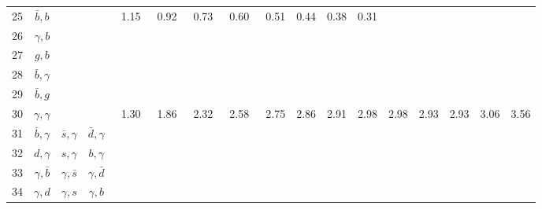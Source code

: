 \begin{tabular}{rcccccccccccccccc}
  25 & $\bar b,b$       &                  &                 &\ 1.15 &\ 0.92 &\ 0.73 &\ 0.60 &\ 0.51 & 0.44 & 0.38 & 0.31 &      &      &      &      &      \\
  26 & $\gamma, b$      &                  &                 &       &       &       &       &       &      &      &      &      &      &      &      &      \\
  27 & $g,b$            &                  &                 &       &       &       &       &       &      &      &      &      &      &      &      &      \\
  28 & $\bar b,\gamma$  &                  &                 &       &       &       &       &       &      &      &      &      &      &      &      &      \\
  29 & $\bar b,g$       &                  &                 &       &       &       &       &       &      &      &      &      &      &      &      &      \\
  30 & $\gamma,\gamma$  &                  &                 &\ 1.30 &\ 1.86 &\ 2.32 &\ 2.58 &\ 2.75 & 2.86 & 2.91 & 2.98 & 2.98 & 2.93 & 2.93 & 3.06 & 3.56 \\
  31 & $\bar b,\gamma$  & $\bar s,\gamma$  & $\bar d,\gamma$ &       &       &       &       &       &      &      &      &      &      &      &      &      \\
  32 & $d,\gamma$       & $s,\gamma$       & $b,\gamma$      &       &       &       &       &       &      &      &      &      &      &      &      &      \\
  33 & $\gamma,\bar b$  & $\gamma,\bar s$  & $\gamma,\bar d$ &       &       &       &       &       &      &      &      &      &      &      &      &      \\
  34 & $\gamma,d$       & $\gamma,s$       & $\gamma, b$     &       &       &       &       &       &      &      &      &      &      &      &      &      \\
  \bottomrule
\end{tabular}
